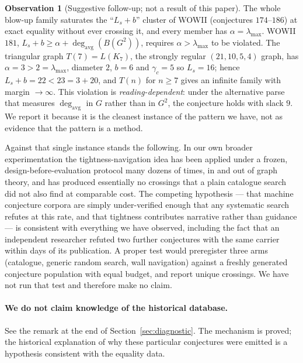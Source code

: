 \documentclass[10pt,a4paper]{article}
\theoremstyle{plain}
\theoremstyle{definition}
\newtheorem{observation}[theorem]{Observation}
\newcommand{\ind}{\alpha}
\newcommand{\bipnum}{b}
\newcommand{\gc}{\gamma_c}
\newcommand{\Ls}{L_s}
\begin{document}
\begin{observation}[Suggestive follow-up; not a result of this paper]
The whole blow-up family saturates the ``$\Ls + \bipnum$'' cluster of WOWII (conjectures
$174$--$186$) at exact equality without ever crossing it, and every member has
$\ind = \lambda_{\max}$. WOWII $181$, $\Ls + \bipnum \ge \ind + \deg_{\mathrm{avg}}(B(G^2))$,
requires $\ind > \lambda_{\max}$ to be violated. The triangular graph
$T(7) = L(K_7)$, the strongly regular $(21,10,5,4)$ graph, has $\ind = 3 > 2 = \lambda_{\max}$,
diameter $2$, $\bipnum = 6$ and $\gc = 5$ so $\Ls = 16$; hence
$\Ls + \bipnum = 22 < 23 = 3 + 20$, and $T(n)$ for $n \ge 7$ gives an infinite family with
margin $\to \infty$. This violation is \emph{reading-dependent}: under the alternative parse
that measures $\deg_{\mathrm{avg}}$ in $G$ rather than in $G^2$, the conjecture holds with slack
$9$. We report it because it is the cleanest instance of the pattern we have, not as evidence
that the pattern is a method.
\end{observation}

Against that single instance stands the following. In our own broader experimentation the
tightness-navigation idea has been applied under a frozen, design-before-evaluation protocol
many dozens of times, in and out of graph theory, and has produced essentially no crossings that
a plain catalogue search did not also find at comparable cost. The competing hypothesis ---
that machine conjecture corpora are simply under-verified enough that any systematic search
refutes at this rate, and that tightness contributes narrative rather than guidance --- is
consistent with everything we have observed, including the fact that an independent researcher
refuted two further conjectures with the same carrier within days of its publication. A proper
test would preregister three arms (catalogue, generic random search, wall navigation) against a
freshly generated conjecture population with equal budget, and report unique crossings. We have
not run that test and therefore make no claim.

\paragraph{We do not claim knowledge of the historical database.} See the remark at the end of
Section~\ref{sec:diagnostic}. The mechanism is proved; the historical explanation of why these
particular conjectures were emitted is a hypothesis consistent with the equality data.
\end{document}
